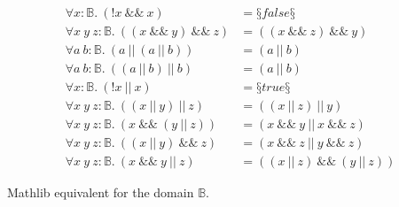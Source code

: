 \begin{conjectureset}[H]
\begin{align}
\forall x : \mathbb{B}.\ (!x\ \&\&\ x) &= §false§\ \\
\forall x\ y\ z : \mathbb{B}.\ ((x\ \&\&\ y)\ \&\&\ z) &= ((x\ \&\&\ z)\ \&\&\ y)\ \\
\forall a\ b : \mathbb{B}.\ (a\ ||\ (a\ ||\ b)) &= (a\ ||\ b)\ \\
\forall a\ b : \mathbb{B}.\ ((a\ ||\ b)\ ||\ b) &= (a\ ||\ b)\ \\
\forall x : \mathbb{B}.\ (!x\ ||\ x) &= §true§\ \\
\forall x\ y\ z : \mathbb{B}.\ ((x\ ||\ y)\ ||\ z) &= ((x\ ||\ z)\ ||\ y)\ \\
\forall x\ y\ z : \mathbb{B}.\ (x\ \&\&\ (y\ ||\ z)) &= (x\ \&\&\ y\ ||\ x\ \&\&\ z)\ \\
\forall x\ y\ z : \mathbb{B}.\ ((x\ ||\ y)\ \&\&\ z) &= (x\ \&\&\ z\ ||\ y\ \&\&\ z)\ \\
\forall x\ y\ z : \mathbb{B}.\ (x\ \&\&\ y\ ||\ z) &= ((x\ ||\ z)\ \&\&\ (y\ ||\ z))
\end{align}
\vspace{-0.9cm}
\caption{Mathlib equivalent for the domain $\mathbb{B}$.}\label{eqs:mathlib_enum}
\end{conjectureset}
